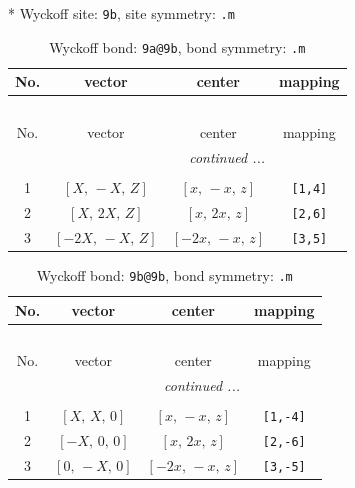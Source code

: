 \documentclass[fleqn,8pt]{jsarticle}
\begin{document}
* Wyckoff site: {\tt 9b}, site symmetry: {\tt .m}
\renewcommand{\arraystretch}{1.2}
\begin{longtable}{cccc}
\caption{Wyckoff bond: {\tt 9a@9b}, bond symmetry: {\tt .m}}
 \\
 \hline \hline
No. & vector & center & mapping \\ \hline \endfirsthead

\multicolumn{3}{l}{\tablename\ \thetable{}} \\
 \hline \hline
No. & vector & center & mapping \\ \hline \endhead

 \hline \hline
\multicolumn{3}{r}{\footnotesize\it continued ...} \\ \endfoot

 \hline \hline
\multicolumn{3}{r}{} \\ \endlastfoot

1 & $\left[ X,\, - X,\, Z \right]$ & $\left[ x,\, - x,\, z \right]$ & {\tt [1,4]} \\ \hline
2 & $\left[ X,\, 2 X,\, Z \right]$ & $\left[ x,\, 2 x,\, z \right]$ & {\tt [2,6]} \\ \hline
3 & $\left[ - 2 X,\, - X,\, Z \right]$ & $\left[ - 2 x,\, - x,\, z \right]$ & {\tt [3,5]} \\
\end{longtable}
\renewcommand{\arraystretch}{1.2}
\begin{longtable}{cccc}
\caption{Wyckoff bond: {\tt 9b@9b}, bond symmetry: {\tt .m}}
 \\
 \hline \hline
No. & vector & center & mapping \\ \hline \endfirsthead

\multicolumn{3}{l}{\tablename\ \thetable{}} \\
 \hline \hline
No. & vector & center & mapping \\ \hline \endhead

 \hline \hline
\multicolumn{3}{r}{\footnotesize\it continued ...} \\ \endfoot

 \hline \hline
\multicolumn{3}{r}{} \\ \endlastfoot

1 & $\left[ X,\, X,\, 0 \right]$ & $\left[ x,\, - x,\, z \right]$ & {\tt [1,-4]} \\ \hline
2 & $\left[ - X,\, 0,\, 0 \right]$ & $\left[ x,\, 2 x,\, z \right]$ & {\tt [2,-6]} \\ \hline
3 & $\left[ 0,\, - X,\, 0 \right]$ & $\left[ - 2 x,\, - x,\, z \right]$ & {\tt [3,-5]} \\
\end{longtable}
\end{document}
